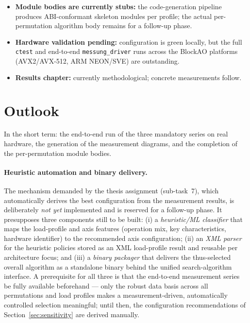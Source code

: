 \begin{itemize}
  \item \textbf{Module bodies are currently stubs:} the code-generation pipeline produces
  ABI-conformant skeleton modules per profile; the actual per-permutation algorithm body remains for
  a follow-up phase.
  \item \textbf{Hardware validation pending:} configuration is green locally, but the full
  \texttt{ctest} and end-to-end \texttt{messung\_driver} runs across the BlockAO platforms
  (AVX2/AVX-512, ARM NEON/SVE) are outstanding.
  \item \textbf{Results chapter:} currently methodological; concrete measurements follow.
\end{itemize}

\section{Outlook}\label{sec:outlook}

In the short term: the end-to-end run of the three mandatory series on real hardware, the generation
of the measurement diagrams, and the completion of the per-permutation module bodies.

\paragraph{Heuristic automation and binary delivery.} The mechanism demanded by the thesis
assignment (sub-task~7), which automatically derives the best configuration from the measurement
results, is deliberately \emph{not yet} implemented and is reserved for a follow-up phase. It
presupposes three components still to be built: (i) a \emph{heuristic/ML classifier} that maps the
load-profile and axis features (operation mix, key characteristics, hardware identifier) to the
recommended axis configuration; (ii) an \emph{XML parser} for the heuristic policies stored as an
XML load-profile result and reusable per architecture focus; and (iii) a \emph{binary packager} that
delivers the thus-selected overall algorithm as a standalone binary behind the unified
search-algorithm interface. A prerequisite for all three is that the end-to-end measurement series
be fully available beforehand --- only the robust data basis across all permutations and load
profiles makes a measurement-driven, automatically controlled selection meaningful; until then, the
configuration recommendations of Section~\ref{sec:sensitivity} are derived manually.

